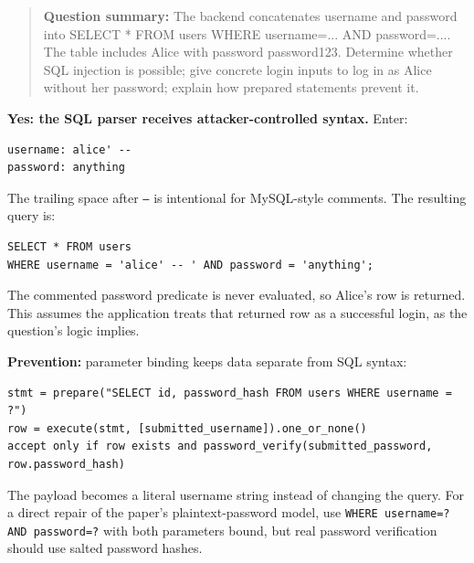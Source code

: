 \documentclass[11pt,a4paper]{article}
\begin{document}
\begin{quote}\small

\textbf{Question summary:} The backend concatenates username and password into SELECT * FROM users WHERE username=\allowbreak{}... AND password=\allowbreak{}.... The table includes Alice with password password123. Determine whether SQL injection is possible; give concrete login inputs to log in as Alice without her password; explain how prepared statements prevent it.



\end{quote}

\textbf{Yes: the SQL parser receives attacker-controlled syntax.} Enter:



\begin{Verbatim}[breaklines=true,breakanywhere=true,fontsize=\small,frame=single,rulecolor=\color{PanelBorder}]
username: alice' -- 
password: anything
\end{Verbatim}

The trailing space after \texttt{--} is intentional for MySQL-style comments. The resulting query is:



\begin{Verbatim}[breaklines=true,breakanywhere=true,fontsize=\small,frame=single,rulecolor=\color{PanelBorder}]
SELECT * FROM users
WHERE username = 'alice' -- ' AND password = 'anything';
\end{Verbatim}

The commented password predicate is never evaluated,\allowbreak{} so Alice’s row is returned. This assumes the application treats that returned row as a successful login,\allowbreak{} as the question’s logic implies.


\textbf{Prevention:} parameter binding keeps data separate from SQL syntax:



\begin{Verbatim}[breaklines=true,breakanywhere=true,fontsize=\small,frame=single,rulecolor=\color{PanelBorder}]
stmt = prepare("SELECT id, password_hash FROM users WHERE username = ?")
row = execute(stmt, [submitted_username]).one_or_none()
accept only if row exists and password_verify(submitted_password, row.password_hash)
\end{Verbatim}

The payload becomes a literal username string instead of changing the query. For a direct repair of the paper’s plaintext-password model,\allowbreak{} use \texttt{WHERE username=\allowbreak{}? AND password=\allowbreak{}?} with both parameters bound,\allowbreak{} but real password verification should use salted password hashes.
\end{document}
